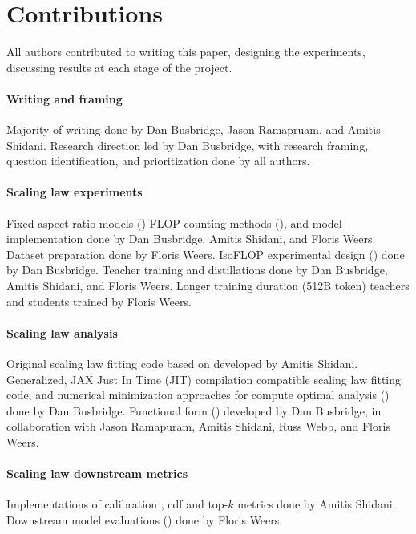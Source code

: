 \section{Contributions}
\label{sec:contributions}
All authors contributed to writing this paper, designing the experiments, discussing results at each stage of the project.

\paragraph{Writing and framing} Majority of writing done by Dan Busbridge, Jason Ramapruam, and Amitis Shidani.
Research direction led by Dan Busbridge, with research framing, question identification, and prioritization done by all authors.

\paragraph{Scaling law experiments}
Fixed aspect ratio models () 
FLOP counting methods (),
and model implementation done by 
Dan Busbridge,
Amitis Shidani,
and
Floris Weers.
Dataset preparation done by Floris Weers.
IsoFLOP experimental design () done by Dan Busbridge.
Teacher training and distillations done by 
Dan Busbridge,
Amitis Shidani,
and
Floris Weers.
Longer training duration (512B token) teachers and students
trained by Floris Weers.

\paragraph{Scaling law analysis}
Original scaling law fitting code based on \citet{DBLP:journals/corr/abs-2404-10102} developed by Amitis Shidani.
Generalized, JAX Just In Time (JIT) compilation compatible scaling law fitting code, and numerical minimization approaches for compute optimal analysis ()
done by Dan Busbridge.
Functional form () developed by Dan Busbridge, in collaboration with Jason Ramapuram, Amitis Shidani, Russ Webb, and Floris Weers.

\paragraph{Scaling law downstream metrics}
Implementations of calibration , \gls{cdf} and top-$k$
metrics done by Amitis Shidani.
Downstream model evaluations () done by Floris Weers.

